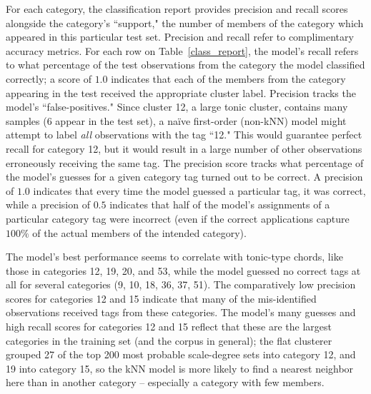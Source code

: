 For each category, the classification report provides precision and recall scores alongside the category's ``support," the number of members of the category which appeared in this particular test set.  Precision and recall refer to complimentary accuracy metrics.  For each row on Table~\ref{class_report}, the model's recall refers to what percentage of the test observations from the category the model classified correctly; a score of $1.0$ indicates that each of the members from the category appearing in the test received the appropriate cluster label.  Precision tracks the model's ``false-positives."  Since cluster 12, a large tonic cluster, contains many samples (6 appear in the test set), a na\"{i}ve first-order (non-kNN) model might attempt to label \emph{all} observations with the tag ``12."  This would guarantee perfect recall for category 12, but it would result in a large number of other observations erroneously receiving the same tag.  The precision score tracks what percentage of the model's guesses for a given category tag turned out to be correct.  A precision of $1.0$ indicates that every time the model guessed a particular tag, it was correct, while a precision of $0.5$ indicates that half of the model's assignments of a particular category tag were incorrect (even if the correct applications capture $100\%$ of the actual members of the intended category).

The model's best performance seems to correlate with tonic-type chords, like those in categories 12, 19, 20, and 53, while the model guessed no correct tags at all for several categories (9, 10, 18, 36, 37, 51).  The comparatively low precision scores for categories 12 and 15 indicate that many of the mis-identified observations received tags from these categories.  The model's many guesses and high recall scores for categories 12 and 15 reflect that these are the largest categories in the training set (and the corpus in general); the flat clusterer grouped 27 of the top 200 most probable scale-degree sets into category 12, and 19 into category 15, so the kNN model is more likely to find a nearest neighbor here than in another category -- especially a category with few members.

